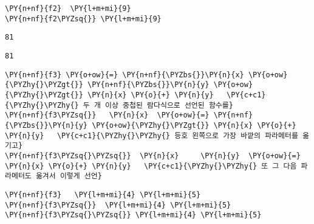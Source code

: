     \begin{tcolorbox}[breakable, size=fbox, boxrule=1pt, pad at break*=1mm,colback=cellbackground, colframe=cellborder, top=.75ex]
\begin{Verbatim}[commandchars=\\\{\}]
\PY{n+nf}{f2}  \PY{l+m+mi}{9}
\PY{n+nf}{f2\PYZsq{}} \PY{l+m+mi}{9}
\end{Verbatim}
\end{tcolorbox}

    
    \begin{Verbatim}[commandchars=\\\{\}]
81
    \end{Verbatim}

    
    
    \begin{Verbatim}[commandchars=\\\{\}]
81
    \end{Verbatim}

    
    \begin{tcolorbox}[breakable, size=fbox, boxrule=1pt, pad at break*=1mm,colback=cellbackground, colframe=cellborder, top=.75ex]
\begin{Verbatim}[commandchars=\\\{\}]
\PY{n+nf}{f3} \PY{o+ow}{=} \PY{n+nf}{\PYZbs{}}\PY{n}{x} \PY{o+ow}{\PYZhy{}\PYZgt{}} \PY{n+nf}{\PYZbs{}}\PY{n}{y} \PY{o+ow}{\PYZhy{}\PYZgt{}} \PY{n}{x} \PY{o}{+} \PY{n}{y}   \PY{c+c1}{\PYZhy{}\PYZhy{} 두 개 이상 중첩된 람다식으로 선언된 함수를}
\PY{n+nf}{f3\PYZsq{}}   \PY{n}{x}  \PY{o+ow}{=} \PY{n+nf}{\PYZbs{}}\PY{n}{y} \PY{o+ow}{\PYZhy{}\PYZgt{}} \PY{n}{x} \PY{o}{+} \PY{n}{y}   \PY{c+c1}{\PYZhy{}\PYZhy{} 등호 왼쪽으로 가장 바깥의 파라메터를 옮기고}
\PY{n+nf}{f3\PYZsq{}\PYZsq{}}  \PY{n}{x}     \PY{n}{y}  \PY{o+ow}{=} \PY{n}{x} \PY{o}{+} \PY{n}{y}   \PY{c+c1}{\PYZhy{}\PYZhy{} 또 그 다음 파라메터도 옮겨서 이렇게 선언}
\end{Verbatim}
\end{tcolorbox}

    \begin{tcolorbox}[breakable, size=fbox, boxrule=1pt, pad at break*=1mm,colback=cellbackground, colframe=cellborder, top=.75ex]
\begin{Verbatim}[commandchars=\\\{\}]
\PY{n+nf}{f3}   \PY{l+m+mi}{4} \PY{l+m+mi}{5}
\PY{n+nf}{f3\PYZsq{}}  \PY{l+m+mi}{4} \PY{l+m+mi}{5}
\PY{n+nf}{f3\PYZsq{}\PYZsq{}} \PY{l+m+mi}{4} \PY{l+m+mi}{5}
\end{Verbatim}
\end{tcolorbox}

